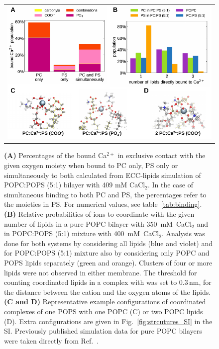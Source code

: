 \documentclass[journal=jctcce,manuscript=article]{achemso}
\newlength{\figwidth}
\newlength{\figwidthfull}
\begin{document}
\begin{figure}[tbp!] 
  \centering 
  \begin{tabular}{ c }
  \includegraphics[width=\figwidthfull]{../img/populations_stoichiometry_structures.pdf} 
  \end{tabular}
  \caption{ \label{fig:cacl_complexes} 
    \textbf{(A)} Percentages of the bound Ca$^{2+}$ 
    in exclusive contact with the given oxygen moiety
    when bound to PC only, PS only or simultaneously to both
    calculated from ECC-lipids simulation of POPC:POPS (5:1) bilayer with 409 mM CaCl$_2$. 
	In the case of simultaneous binding to both PC and PS,
	the percentages refer to the moieties in PS.
        For numerical values, see table~\ref{tab:binding}.
    \textbf{(B)} Relative probabilities of  ions to coordinate with the given number of lipids
    in a pure POPC bilayer with 350~mM~CaCl$_2$ and in POPC:POPS (5:1) mixture with 400~mM~CaCl$_2$.  
    Analysis was done for both systems by considering all lipids (blue and violet) and
    for POPC:POPS (5:1) mixture also by considering only POPC and POPS lipids separately (green and orange). 
    Clusters of four or more lipids were not observed in either membrane.
    The threshold for counting coordinated lipids in a complex with  was set to $0.3\,\mathrm{nm}$, 
    for the distance between the cation and the oxygen atoms of the lipids. 
    \textbf{(C and D)} Representative example configurations of  coordinated complexes 
    of one POPS with one POPC (C) or two POPC lipids (D). 
    Extra configurations are given in Fig.~\ref{fig:strcutures_SI} in the SI. 
    Previously published simulation data for pure POPC bilayers \cite{melcr18} were taken directly from Ref.~. 
  }
\end{figure} 
\end{document}
